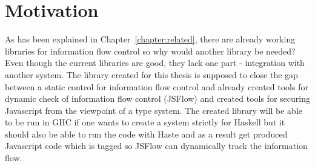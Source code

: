 \section{Motivation}
As has been explained in Chapter~\ref{chapter:related}, there are already working libraries for information flow control so why would another library be needed? Even though the current libraries are good, they lack one part - integration with another system. The library created for this thesis is supposed to close the gap between a static control for information flow control and already created tools for dynamic check of information flow control (JSFlow) and created tools for securing Javascript from the viewpoint of a type system. The created library will be able to be run in GHC if one wants to create a system strictly for Haskell but it should also be able to run the code with Haste and as a result get produced Javascript code which is tagged so JSFlow can dynamically track the information flow.
